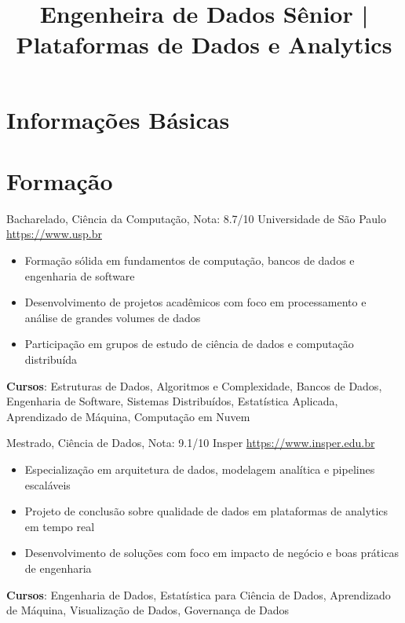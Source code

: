 \documentclass[a4paper, serif, 10pt]{moderncv}
\title{Engenheira de Dados Sênior | Plataformas de Dados e Analytics}
\begin{document}
\maketitle

\section{Informações Básicas}

\section{Formação}

        {Bacharelado, Ciência da Computação, Nota: 8.7/10}
        {Universidade de São Paulo}
        {\url{https://www.usp.br}}
        {}
        {\begin{itemize}
\item Formação sólida em fundamentos de computação, bancos de dados e engenharia de software
\item Desenvolvimento de projetos acadêmicos com foco em processamento e análise de grandes volumes de dados
\item Participação em grupos de estudo de ciência de dados e computação distribuída
\end{itemize}
\textbf{Cursos}: Estruturas de Dados, Algoritmos e Complexidade, Bancos de Dados, Engenharia de Software, Sistemas Distribuídos, Estatística Aplicada, Aprendizado de Máquina, Computação em Nuvem}

        {Mestrado, Ciência de Dados, Nota: 9.1/10}
        {Insper}
        {\url{https://www.insper.edu.br}}
        {}
        {\begin{itemize}
\item Especialização em arquitetura de dados, modelagem analítica e pipelines escaláveis
\item Projeto de conclusão sobre qualidade de dados em plataformas de analytics em tempo real
\item Desenvolvimento de soluções com foco em impacto de negócio e boas práticas de engenharia
\end{itemize}
\textbf{Cursos}: Engenharia de Dados, Estatística para Ciência de Dados, Aprendizado de Máquina, Visualização de Dados, Governança de Dados}
\end{document}
